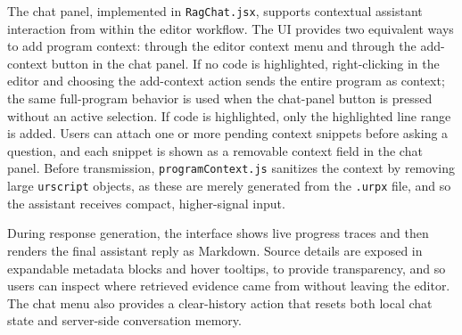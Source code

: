 The chat panel, implemented in \texttt{RagChat.jsx}, supports contextual assistant interaction from within the editor workflow. The UI provides two equivalent ways to add program context: through the editor context menu and through the add-context button in the chat panel. If no code is highlighted, right-clicking in the editor and choosing the add-context action sends the entire program as context; the same full-program behavior is used when the chat-panel button is pressed without an active selection. If code is highlighted, only the highlighted line range is added. Users can attach one or more pending context snippets before asking a question, and each snippet is shown as a removable context field in the chat panel. Before transmission, \texttt{programContext.js} sanitizes the context by removing large \texttt{urscript} objects, as these are merely generated from the \texttt{.urpx} file, and so the assistant receives compact, higher-signal input.

During response generation, the interface shows live progress traces and then renders the final assistant reply as Markdown. Source details are exposed in expandable metadata blocks and hover tooltips, to provide transparency, and so users can inspect where retrieved evidence came from without leaving the editor. The chat menu also provides a clear-history action that resets both local chat state and server-side conversation memory.

